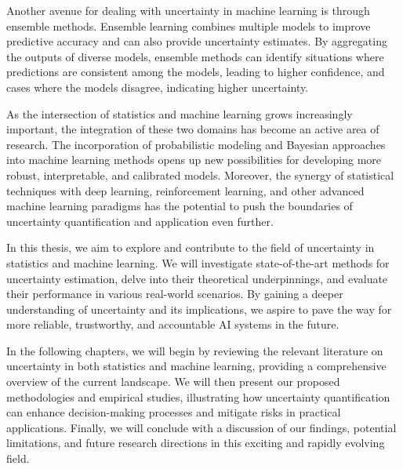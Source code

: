 Another avenue for dealing with uncertainty in machine learning is through ensemble methods. Ensemble learning combines multiple models to improve predictive accuracy and can also provide uncertainty estimates. By aggregating the outputs of diverse models, ensemble methods can identify situations where predictions are consistent among the models, leading to higher confidence, and cases where the models disagree, indicating higher uncertainty.

As the intersection of statistics and machine learning grows increasingly important, the integration of these two domains has become an active area of research. The incorporation of probabilistic modeling and Bayesian approaches into machine learning methods opens up new possibilities for developing more robust, interpretable, and calibrated models. Moreover, the synergy of statistical techniques with deep learning, reinforcement learning, and other advanced machine learning paradigms has the potential to push the boundaries of uncertainty quantification and application even further.

In this thesis, we aim to explore and contribute to the field of uncertainty in statistics and machine learning. We will investigate state-of-the-art methods for uncertainty estimation, delve into their theoretical underpinnings, and evaluate their performance in various real-world scenarios. By gaining a deeper understanding of uncertainty and its implications, we aspire to pave the way for more reliable, trustworthy, and accountable AI systems in the future.

In the following chapters, we will begin by reviewing the relevant literature on uncertainty in both statistics and machine learning, providing a comprehensive overview of the current landscape. We will then present our proposed methodologies and empirical studies, illustrating how uncertainty quantification can enhance decision-making processes and mitigate risks in practical applications. Finally, we will conclude with a discussion of our findings, potential limitations, and future research directions in this exciting and rapidly evolving field.

\fi
